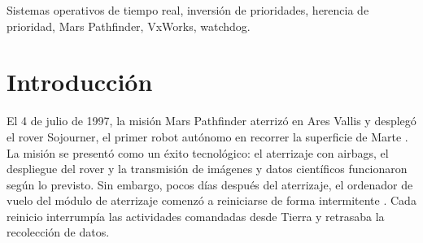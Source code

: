 \documentclass[journal]{IEEEtran}
\begin{document}
\begin{abstract}
Mars Pathfinder aterrizó en Marte el 4 de julio de 1997 y desplegó el rover Sojourner. Días después, el ordenador de vuelo del módulo de aterrizaje comenzó a reiniciarse. Este artículo reconstruye el caso con fuentes primarias y un modelo determinista en C11 y ensamblador x86-64. El análisis muestra que el fallo no fue un error del planificador ni una pérdida de datos, sino una inversión de prioridades no acotada en el mutex interno de \texttt{select()}, configurado sin herencia de prioridad y agravado por una carga de tareas medias superior a la prevista. El watchdog de \texttt{bc\_sched} convirtió el incumplimiento del ciclo de 1553, de 125~ms, en un reinicio. El modelo reproduce el fallo: con la herencia desactivada se producen tres reinicios y un bloqueo máximo de 125~ms; al activarla, los reinicios desaparecen y el bloqueo baja a 5~ms; un control sin mutex compartido confirma la causa. La conclusión es que la corrección temporal es una propiedad de configuración y de observabilidad, no solo del algoritmo de planificación.
\end{abstract}

\begin{IEEEkeywords}
Sistemas operativos de tiempo real, inversión de prioridades, herencia de prioridad, Mars Pathfinder, VxWorks, watchdog.
\end{IEEEkeywords}

\section{Introducción}
\label{sec:introduccion}

El 4 de julio de 1997, la misión Mars Pathfinder aterrizó en Ares Vallis y desplegó el rover Sojourner, el primer robot autónomo en recorrer la superficie de Marte \cite{nasa2017pathfinder}. La misión se presentó como un éxito tecnológico: el aterrizaje con airbags, el despliegue del rover y la transmisión de imágenes y datos científicos funcionaron según lo previsto. Sin embargo, pocos días después del aterrizaje, el ordenador de vuelo del módulo de aterrizaje comenzó a reiniciarse de forma intermitente \cite{reeves1997mars}. Cada reinicio interrumpía las actividades comandadas desde Tierra y retrasaba la recolección de datos.
\end{document}
